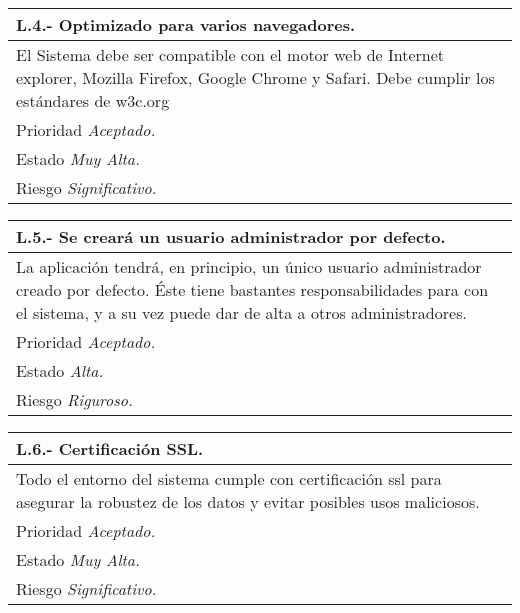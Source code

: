 	\begin{center}
	\begin{tabulary}{15cm}{|L|}
		\hline
			\bf{L.4.- Optimizado para varios navegadores.} \\
		\hline
			El Sistema debe ser compatible con el motor web de Internet explorer, Mozilla Firefox, Google Chrome y Safari. Debe cumplir los estándares de w3c.org\\
		\hline
			Prioridad \textit{Aceptado.} \\
		\hline
			Estado \textit{Muy Alta.} \\
		\hline
			Riesgo \textit{Significativo.} \\
		\hline
	\end{tabulary}
	\end{center}

	\begin{center}
	\begin{tabulary}{15cm}{|L|}
		\hline
			\bf{L.5.- Se creará un usuario administrador por defecto.} \\
		\hline
			La aplicación tendrá, en principio, un único usuario administrador creado por defecto. Éste tiene bastantes responsabilidades para con el sistema, y a su vez puede dar de alta a otros administradores. \\
		\hline
			Prioridad \textit{Aceptado.} \\
		\hline
			Estado \textit{Alta.} \\
		\hline
			Riesgo \textit{Riguroso.} \\
		\hline
	\end{tabulary}
	\end{center}

	\begin{center}
	\begin{tabulary}{15cm}{|L|}
		\hline
			\bf{L.6.- Certificación SSL.} \\
		\hline
			Todo el entorno del sistema cumple con certificación ssl para asegurar la robustez de los datos y evitar posibles usos maliciosos. \\
		\hline
			Prioridad \textit{Aceptado.} \\
		\hline
			Estado \textit{Muy Alta.} \\
		\hline
			Riesgo \textit{Significativo.} \\
		\hline
	\end{tabulary}
	\end{center}

